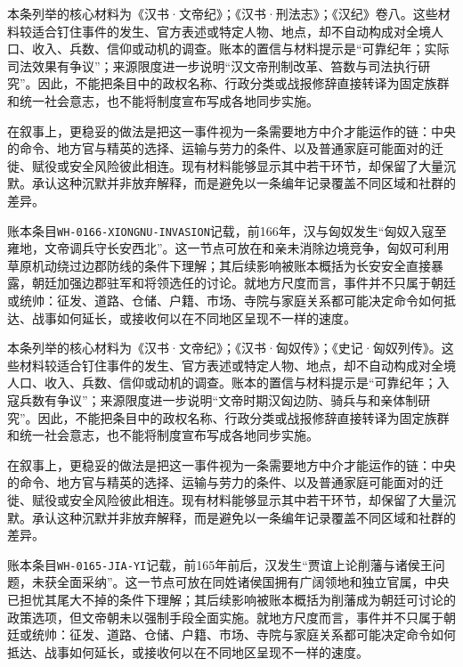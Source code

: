 本条列举的核心材料为《汉书·文帝纪》；《汉书·刑法志》；《汉纪》卷八。这些材料较适合钉住事件的发生、官方表述或特定人物、地点，却不自动构成对全境人口、收入、兵数、信仰或动机的调查。账本的置信与材料提示是“可靠纪年；实际司法效果有争议”；来源限度进一步说明“汉文帝刑制改革、笞数与司法执行研究”。因此，不能把条目中的政权名称、行政分类或战报修辞直接转译为固定族群和统一社会意志，也不能将制度宣布写成各地同步实施。

在叙事上，更稳妥的做法是把这一事件视为一条需要地方中介才能运作的链：中央的命令、地方官与精英的选择、运输与劳力的条件、以及普通家庭可能面对的迁徙、赋役或安全风险彼此相连。现有材料能够显示其中若干环节，却保留了大量沉默。承认这种沉默并非放弃解释，而是避免以一条编年记录覆盖不同区域和社群的差异。

账本条目\texttt{WH-0166-XIONGNU-INVASION}记载，前166年，汉与匈奴发生“匈奴入寇至雍地，文帝调兵守长安西北”。这一节点可放在和亲未消除边境竞争，匈奴可利用草原机动绕过边郡防线的条件下理解；其后续影响被账本概括为长安安全直接暴露，朝廷加强边郡驻军和将领选任的讨论。就地方尺度而言，事件并不只属于朝廷或统帅：征发、道路、仓储、户籍、市场、寺院与家庭关系都可能决定命令如何抵达、战事如何延长，或接收何以在不同地区呈现不一样的速度。

本条列举的核心材料为《汉书·文帝纪》；《汉书·匈奴传》；《史记·匈奴列传》。这些材料较适合钉住事件的发生、官方表述或特定人物、地点，却不自动构成对全境人口、收入、兵数、信仰或动机的调查。账本的置信与材料提示是“可靠纪年；入寇兵数有争议”；来源限度进一步说明“文帝时期汉匈边防、骑兵与和亲体制研究”。因此，不能把条目中的政权名称、行政分类或战报修辞直接转译为固定族群和统一社会意志，也不能将制度宣布写成各地同步实施。

在叙事上，更稳妥的做法是把这一事件视为一条需要地方中介才能运作的链：中央的命令、地方官与精英的选择、运输与劳力的条件、以及普通家庭可能面对的迁徙、赋役或安全风险彼此相连。现有材料能够显示其中若干环节，却保留了大量沉默。承认这种沉默并非放弃解释，而是避免以一条编年记录覆盖不同区域和社群的差异。

账本条目\texttt{WH-0165-JIA-YI}记载，前165年前后，汉发生“贾谊上论削藩与诸侯王问题，未获全面采纳”。这一节点可放在同姓诸侯国拥有广阔领地和独立官属，中央已担忧其尾大不掉的条件下理解；其后续影响被账本概括为削藩成为朝廷可讨论的政策选项，但文帝朝未以强制手段全面实施。就地方尺度而言，事件并不只属于朝廷或统帅：征发、道路、仓储、户籍、市场、寺院与家庭关系都可能决定命令如何抵达、战事如何延长，或接收何以在不同地区呈现不一样的速度。

